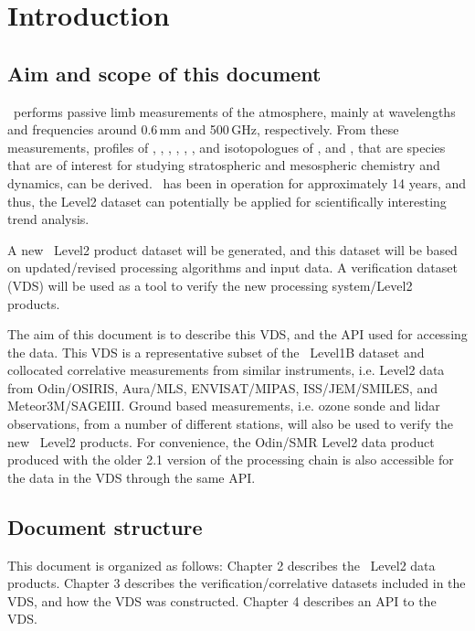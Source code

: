 \chapter{Introduction}
\label{chapter:introduction}


\setcounter{page}{1}


\section{Aim and scope of this document}
\label{sec:aim}
\smr\ performs passive limb measurements of the atmosphere,
mainly at wavelengths and frequencies around 0.6\,mm and 500\,GHz,
respectively.
From these measurements, profiles of 
, , , , 
, , and isotopologues of , and ,
that are species that are of interest for studying stratospheric and 
mesospheric chemistry and dynamics, can be derived. 
\smr\ has been in operation for approximately 14 years, and thus, the Level2
dataset can potentially be applied for scientifically interesting trend analysis.

A new \smr\ Level2 product dataset will be generated, and this dataset will be based
on updated/revised processing algorithms and input data.
A verification dataset (VDS) will be used as a tool to verify the new 
processing system/Level2 products.

The aim of this document is to describe this VDS, and the API used for
accessing the data.
This VDS is a representative subset of the \smr\ Level1B dataset
and collocated correlative measurements from similar
instruments, i.e. Level2 data from Odin/OSIRIS, Aura/MLS, ENVISAT/MIPAS,
ISS/JEM/SMILES, and Meteor3M/SAGEIII.   
Ground based measurements, i.e. ozone sonde and lidar observations,
from a number of different stations, will also be used
to verify the new \smr\ Level2 products.  
For convenience, the Odin/SMR Level2 data product produced with the older 2.1
version of the processing chain is also accessible for the data in the VDS
through the same API.

\section{Document structure}

This document is organized as follows:
Chapter 2 describes the \smr\ Level2 data products.
Chapter 3 describes the verification/correlative datasets
included in the VDS, and how the VDS was constructed.
Chapter 4 describes an API to the VDS.

